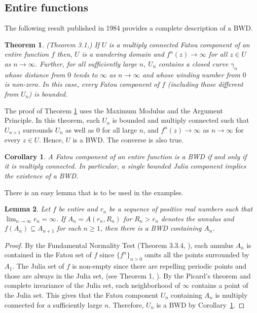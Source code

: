 \documentclass[11pt,a4paper]{article}
\newtheorem{theorem}{Theorem}[section]
\newtheorem{corollary}{Corollary}[theorem]
\newtheorem{lemma}[theorem]{Lemma}
\begin{document}
	\subsection{Entire functions}
	The following result published in 1984 provides a complete description of a BWD.
	\begin{theorem}(Theorem 3.1,\cite{Baker 1984}) \label{Thm1}
		If $U$ is a multiply connected Fatou component of an entire function $f$ then, $U$ is a wandering domain and $f^n(z)\to\infty$ for all $z\in U$ as $n\to\infty$. Further, for all sufficiently large $n$, $U_n$ contains a closed curve $\gamma_n$ whose distance from $0$ tends to $\infty$ as $n\to\infty$ and whose winding number from $0$ is non-zero. In this case, every Fatou component of $f$ (including those different from $U_n$) is bounded.	
	\end{theorem}
	The proof of Theorem \ref{Thm1} uses the Maximum Modulus and the Argument Principle. In this theorem, each $U_n$ is bounded and multiply connected such that $U_{n+1}$ surrounds $U_n$ as well as $0$ for all large $n$, and $f^n(z)\to\infty$ as $n\to\infty$ for every $z\in U$. Hence, $U$ is a BWD. The converse is also true. 
	\begin{corollary}\label{BWD-iff-MCFC}
		A Fatou component of an entire function is a BWD if and only if it is multiply connected. In particular, a single bounded Julia component implies the existence of a BWD.
\end{corollary}
There is an easy lemma that is to be used in the examples.
	\begin{lemma}
		Let $f$ be entire and $r_n$ be a sequence of positive real numbers such that $\lim_{n \to \infty}r_n =\infty$. If   $A_n = A(r_n, R_n)$ for $ R_n >r_n $ denotes the annulus and $f(A_n) \subseteq A_{n+1}$ for each $n \geq 1$, then there is a BWD containing $A_n$.
		\label{BWD-lem}	\end{lemma}
	\begin{proof}
		By the Fundamental Normality Test (Theorem 3.3.4, \cite{Beardon-Book}), each annulus $A_n$ is contained in the Fatou set of $f$ since $\{f^n\}_{n>0}$ omits all the points surrounded by $A_1$. The Julia set of $f$ is non-empty  since there are repelling periodic points and those are always in the Julia set, (see Theorem 1, \cite{Berg 1993}). By the Picard's theorem and complete invariance of the Julia set, each neighborhood of $\infty$ contains a point of the Julia set. This gives that the Fatou component   $U_n$  containing $A_n$ is multiply connected for a sufficiently large $n$. Therefore, $U_n$ is a BWD by Corollary~\ref{BWD-iff-MCFC}.	\end{proof}
 
\end{document}
